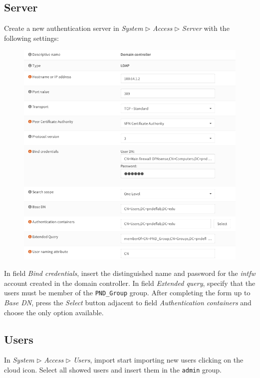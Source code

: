 \documentclass[draft]{homework}
\newcommand{\intfw}{\textit{intfw}\xspace}
\begin{document}
    \subsection{Server}
    Create a new authentication server in \textit{System} $\triangleright$ \textit{Access} $\triangleright$ \textit{Server} with the following settings:
    \begin{figure}[H]
        \centering
        \includegraphics[width=\linewidth]{images/server}
        \label{fig:server}
    \end{figure}

    In field \textit{Bind credentials}, insert the distinguished name and password for the \intfw account created in the domain controller.
    In field \textit{Extended query}, specify that the users must be member of the \texttt{PND\_Group} group.
    After completing the form up to \textit{Base DN}, press the \textit{Select} button adjacent to field \textit{Authentication containers} and choose the only option available.
    
    \subsection{Users}
    In \textit{System} $\triangleright$ \textit{Access} $\triangleright$ \textit{Users}, import start importing new users clicking on the cloud icon.
    Select all showed users and insert them in the \texttt{admin} group.
    
\end{document}
